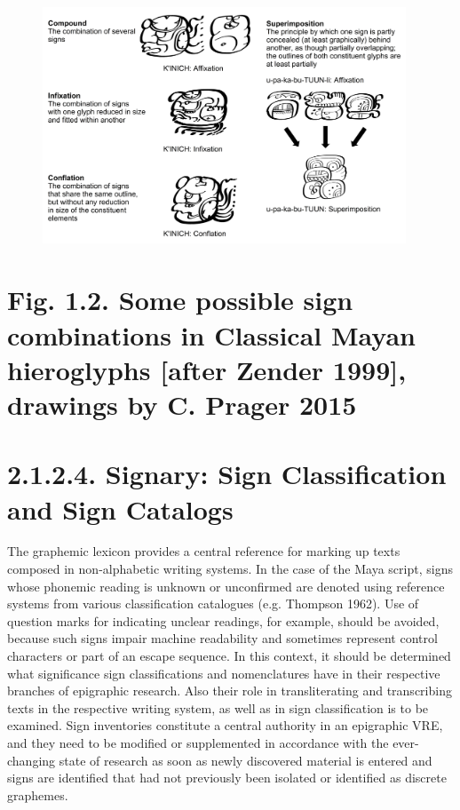 \documentclass[amsthm,ebook]{saparticle}
\begin{document}
\begin{figure}
\centering
\includegraphics[width=10.816cm,height=7.054cm]{EAGLE2016submission8revisedx-img002.png}
\end{figure}
\section{}
\section[Fig. 1.2. Some possible sign combinations in Classical Mayan hieroglyphs [after Zender 1999{]}, drawings by C.
Prager 2015 ]{Fig. 1.2. Some possible sign combinations in Classical Mayan hieroglyphs [after Zender 1999], drawings by
C. Prager 2015 }

\bigskip

\section[2.1.2.4. Signary: Sign Classification and Sign Catalogs ]{2.1.2.4. Signary: Sign Classification and Sign
Catalogs }
The graphemic lexicon provides a central reference for marking up texts composed in non-alphabetic writing systems. In
the case of the Maya script, signs whose phonemic reading is unknown or unconfirmed are denoted using reference systems
from various classification catalogues (e.g. Thompson 1962). Use of question marks for indicating unclear readings, for
example, should be avoided, because such signs impair machine readability and sometimes represent control characters or
part of an escape sequence. In this context, it should be determined what significance sign classifications and
nomenclatures have in their respective branches of epigraphic research. Also their role in transliterating and
transcribing texts in the respective writing system, as well as in sign classification is to be examined. Sign
inventories constitute a central authority in an epigraphic VRE, and they need to be modified or supplemented in
accordance with the ever-changing state of research as soon as newly discovered material is entered and signs are
identified that had not previously been isolated or identified as discrete graphemes. 
\end{document}
